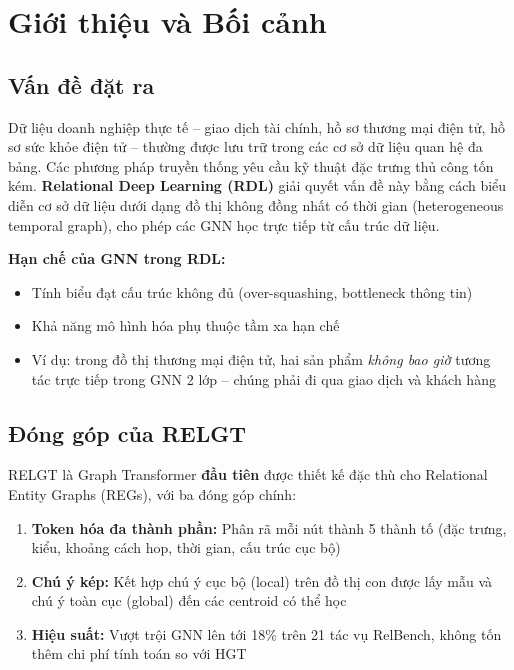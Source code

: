 \documentclass[12pt,a4paper]{article}
\begin{document}
\section{Giới thiệu và Bối cảnh}

\subsection{Vấn đề đặt ra}

Dữ liệu doanh nghiệp thực tế -- giao dịch tài chính, hồ sơ thương mại điện tử,
hồ sơ sức khỏe điện tử -- thường được lưu trữ trong các cơ sở dữ liệu quan hệ
đa bảng. Các phương pháp truyền thống yêu cầu kỹ thuật đặc trưng thủ công
tốn kém. \textbf{Relational Deep Learning (RDL)} giải quyết vấn đề này bằng
cách biểu diễn cơ sở dữ liệu dưới dạng đồ thị không đồng nhất có thời gian
(heterogeneous temporal graph), cho phép các GNN học trực tiếp từ cấu trúc dữ liệu.

\begin{mdframed}
\textbf{Hạn chế của GNN trong RDL:}
\begin{itemize}[nosep]
  \item Tính biểu đạt cấu trúc không đủ (over-squashing, bottleneck thông tin)
  \item Khả năng mô hình hóa phụ thuộc tầm xa hạn chế
  \item Ví dụ: trong đồ thị thương mại điện tử, hai sản phẩm \emph{không bao giờ}
        tương tác trực tiếp trong GNN 2 lớp -- chúng phải đi qua giao dịch và khách hàng
\end{itemize}
\end{mdframed}

\subsection{Đóng góp của RELGT}

\begin{highlight}
RELGT là Graph Transformer \textbf{đầu tiên} được thiết kế đặc thù cho
Relational Entity Graphs (REGs), với ba đóng góp chính:
\begin{enumerate}[nosep]
  \item \textbf{Token hóa đa thành phần:} Phân rã mỗi nút thành 5 thành tố
        (đặc trưng, kiểu, khoảng cách hop, thời gian, cấu trúc cục bộ)
  \item \textbf{Chú ý kép:} Kết hợp chú ý cục bộ (local) trên đồ thị con
        được lấy mẫu và chú ý toàn cục (global) đến các centroid có thể học
  \item \textbf{Hiệu suất:} Vượt trội GNN lên tới 18\% trên 21 tác vụ RelBench,
        không tốn thêm chi phí tính toán so với HGT
\end{enumerate}
\end{highlight}
\end{document}
